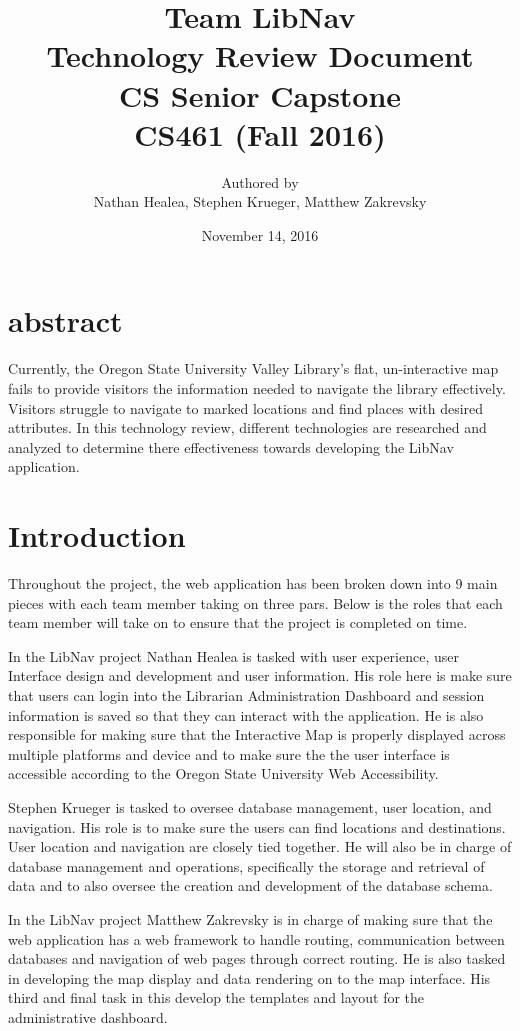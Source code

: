\documentclass[letterpaper,10pt,titlepage, onecolumn, compsoc]{IEEEtran}
\title{Team LibNav \\ Technology Review Document \\ CS Senior Capstone \\ \vspace{2mm}\small CS461 (Fall 2016)}
\author{Authored by \\ Nathan Healea, Stephen Krueger, Matthew Zakrevsky}
\date{November 14, 2016}
\begin{document}
\maketitle



\section*{abstract}
Currently, the Oregon State University Valley Library's flat, un-interactive map fails to provide visitors the information needed to navigate the library effectively. Visitors struggle to navigate to marked locations and find places with desired attributes. In this technology review, different technologies are researched and analyzed to determine there effectiveness towards developing the LibNav application. 
\newpage

\tableofcontents
\newpage


\newpage

\section{Introduction}
Throughout the project, the web application has been broken down into 9 main pieces with each team member taking on three pars. Below is the roles that each team member will take on to ensure that the project is completed on time.

In the LibNav project Nathan Healea is tasked with user experience, user Interface design and development and user information. His role here is make sure that users can login into the Librarian Administration Dashboard and session information is saved so that they can interact with the application. He is also responsible for making sure that the Interactive Map is properly displayed across multiple platforms and device and to make sure the the user interface is accessible according to the Oregon State University Web Accessibility.

Stephen Krueger is tasked to oversee database management, user location, and navigation. His role is to make sure the users can find  locations and destinations. User location and navigation are closely tied together. He will also be in charge of database management and operations, specifically the storage and retrieval of data and to also oversee the creation and development of the database schema. 

In the LibNav project Matthew Zakrevsky is in charge of making sure that the web application has a web framework to handle routing, communication between databases and navigation of web pages through correct routing. He is also tasked in developing the map display and data rendering on to the map interface. His third and final task in this develop the templates and layout for the administrative dashboard.
\end{document}
